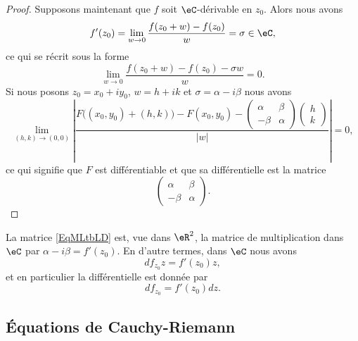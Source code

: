 \begin{proof}
    Supposons maintenant que \( f\) soit $\eC$-dérivable en \( z_0\). Alors nous avons
    \begin{equation}
        f'(z_0)=\lim_{w\to 0} \frac{ f(z_0+w)-f(z_0) }{ w }=\sigma\in \eC,
    \end{equation}
    ce qui se récrit sous la forme
    \begin{equation}
        \lim_{w\to 0} \frac{ f(z_0+w)-f(z_0)-\sigma w }{ w }=0.
    \end{equation}
    Si nous posons \( z_0=x_0+iy_0\), \( w=h+ik\) et \( \sigma=\alpha-i\beta\) nous avons
    \begin{equation}
        \lim_{(h,k)\to (0,0)} \left| \frac{ F\big( (x_0,y_0)+(h,k) \big)-F(x_0,y_0)-\begin{pmatrix}
            \alpha    &   \beta    \\ 
            -\beta    &   \alpha    
        \end{pmatrix}\begin{pmatrix}
            h    \\ 
            k    
        \end{pmatrix}}{ | w | } \right| =0,
    \end{equation}
    ce qui signifie que \( F\) est différentiable et que sa différentielle est la matrice
    \begin{equation}    \label{EqMLtbLD}
       \begin{pmatrix}
           \alpha &   \beta    \\ 
           -\beta &   \alpha    
       \end{pmatrix}.
    \end{equation}
\end{proof}

La matrice \eqref{EqMLtbLD} est, vue dans \( \eR^2\), la matrice de multiplication dans \( \eC\) par \( \alpha-i\beta=f'(z_0)\). En d'autre termes, dans \( \eC\) nous avons
\begin{equation}
    df_{z_0}z=f'(z_0)z,
\end{equation}
et en particulier la différentielle est donnée par
\begin{equation}        \label{EqPropZOkfmO}
    df_{z_0}=f'(z_0)dz.
\end{equation}

\subsection{Équations de Cauchy-Riemann}

